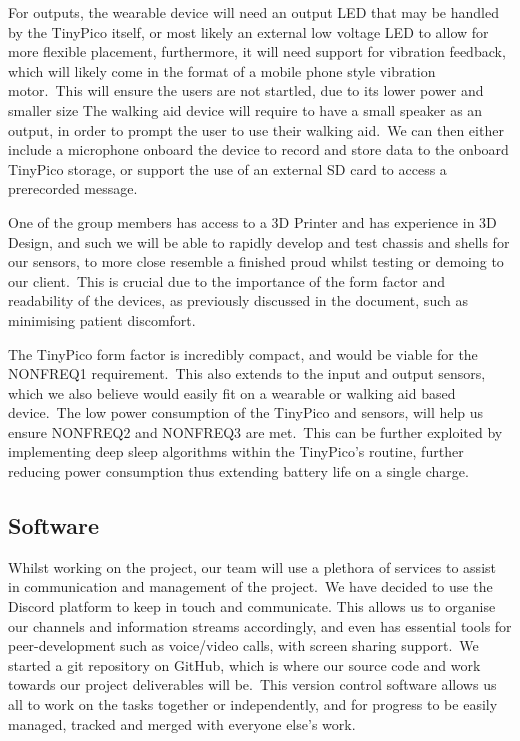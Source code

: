             For outputs, the wearable device will need an output LED that may be handled by the TinyPico itself, or most
            likely an external low voltage LED to allow for more flexible placement, furthermore, it will need support
            for vibration feedback, which will likely come in the format of a mobile phone style vibration motor.\ This
            will ensure the users are not startled, due to its lower power and smaller size The walking aid device will
            require to have a small speaker as an output, in order to prompt the user to use their walking aid.\ We can
            then either include a microphone onboard the device to record and store data to the onboard TinyPico
            storage, or support the use of an external SD card to access a prerecorded message.

            One of the group members has access to a 3D Printer and has experience in 3D Design, and such we will be
            able to rapidly develop and test chassis and shells for our sensors, to more close resemble a finished
            proud whilst testing or demoing to our client.\ This is crucial due to the importance of the form factor
            and readability of the devices, as previously discussed in the document, such as minimising patient discomfort.

            The TinyPico form factor is incredibly compact, and would be viable for the NONFREQ1 requirement.\ This also
            extends to the input and output sensors, which we also believe would easily fit on a wearable or walking aid
            based device.\ The low power consumption of the TinyPico and sensors,  will help us ensure NONFREQ2 and
            NONFREQ3 are met.\ This can be further exploited by implementing deep sleep algorithms within the TinyPico's
            routine, further reducing power consumption thus extending battery life on a single charge.

        \subsection{Software}
            Whilst working on the project, our team will use a plethora of services to assist in communication and
            management of the project.\ We have decided to use the Discord platform to keep in touch and communicate.
            This allows us to organise our channels and information streams accordingly, and even has essential tools
            for peer-development such as voice/video calls, with screen sharing support.\ We started a git repository on
            GitHub, which is where our source code and work towards our project deliverables will be.\ This version
            control software allows us all to work on the tasks together or independently, and for progress to be easily
            managed, tracked and merged with everyone else's work.

